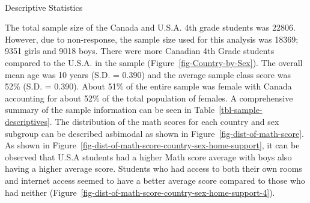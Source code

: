 \documentclass[
  letterpaper,
  DIV=11,
  numbers=noendperiod]{scrartcl}
\makeatletter
\let\oldparagraph\paragraph
\renewcommand{\paragraph}{
    \@ifstar
      \xxxParagraphStar
      \xxxParagraphNoStar
  }
\newcommand{\xxxParagraphStar}[1]{\oldparagraph*{#1}\mbox{}}
\newcommand{\xxxParagraphNoStar}[1]{\oldparagraph{#1}\mbox{}}
\makeatother
\begin{document}
\paragraph{Descriptive Statistics}\label{descriptive-statistics}

The total sample size of the Canada and U.S.A. 4th grade students was
22806. However, due to non-response, the sample size used for this
analysis was 18369; 9351 girls and 9018 boys. There were more Canadian
4th Grade students compared to the U.S.A. in the sample
(Figure~\ref{fig-Country-by-Sex}). The overall mean age was 10 years
(S.D. = 0.390) and the average sample class score was 52\% (S.D. =
0.390). About 51\% of the entire sample was female with Canada
accounting for about 52\% of the total population of females. A
comprehensive summary of the sample information can be seen in
Table~\ref{tbl-sample-descriptives}. The distribution of the math scores
for each country and sex subgroup can be described asbimodal as shown in
Figure~\ref{fig-dist-of-math-score}. As shown in
Figure~\ref{fig-dist-of-math-score-country-sex-home-support}, it can be
observed that U.S.A students had a higher Math score average with boys
also having a higher average score. Students who had access to both
their own rooms and internet access seemed to have a better average
score compared to those who had neither
(Figure~\ref{fig-dist-of-math-score-country-sex-home-support-4}).
\end{document}
